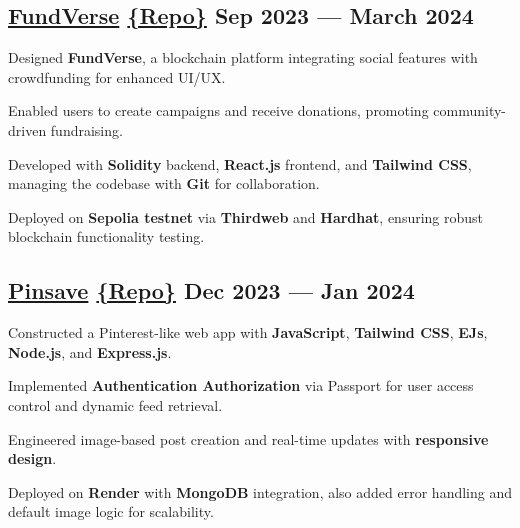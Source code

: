 \subsection{\href{https://fundverse-by-us.vercel.app/}{FundVerse} \href{https://github.com/thekiranmahajan/FundVerse}{\{Repo\}} \hfill Sep 2023 --- March 2024}
\begin{zitemize}
\item Designed \textbf{FundVerse}, a blockchain platform integrating social features with crowdfunding for enhanced UI/UX.
\item Enabled users to create campaigns and receive donations, promoting community-driven fundraising.
\item Developed with \textbf{Solidity} backend, \textbf{React.js} frontend, and \textbf{Tailwind CSS}, managing the codebase with \textbf{Git} for collaboration.
\item Deployed on \textbf{Sepolia testnet} via \textbf{Thirdweb} and \textbf{Hardhat}, ensuring robust blockchain functionality testing.
\end{zitemize}


\subsection{\href{https://pinsave-by-ray.onrender.com/}{Pinsave} \href{https://github.com/thekiranmahajan/pinsave}{\{Repo\}} \hfill Dec 2023 --- Jan 2024}
\begin{zitemize}
\item Constructed a Pinterest-like web app with \textbf{JavaScript}, \textbf{Tailwind CSS}, \textbf{EJs}, \textbf{Node.js}, and \textbf{Express.js}.
\item Implemented \textbf{Authentication Authorization} via Passport for user access control and dynamic feed retrieval.
\item Engineered image-based post creation and real-time updates with \textbf{responsive design}.
\item Deployed on \textbf{Render} with \textbf{MongoDB} integration, also added error handling and default image logic for scalability.
\end{zitemize}

